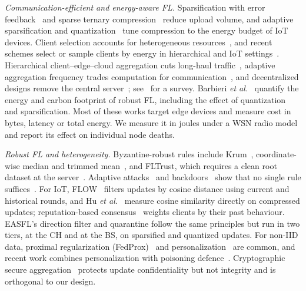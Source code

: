 \documentclass[journal]{IEEEtran}
\begin{document}
\textit{Communication-efficient and energy-aware FL.} Sparsification with error feedback~\cite{lin2018dgc,stich2018} and sparse ternary compression~\cite{sattler2020} reduce upload volume, and adaptive sparsification and quantization~\cite{marnissi2024,compaore2025,zhu2025} tune compression to the energy budget of IoT devices. Client selection accounts for heterogeneous resources~\cite{nishio2019}, and recent schemes select or sample clients by energy in hierarchical and IoT settings~\cite{trindade2024,trindade2026,yang2025symbiotic}. Hierarchical client--edge--cloud aggregation cuts long-haul traffic~\cite{liu2020hfl}, adaptive aggregation frequency trades computation for communication~\cite{wang2019adaptive}, and decentralized designs remove the central server~\cite{taherijavan2025}; see~\cite{yan2024survey} for a survey. Barbieri \textit{et al.}~\cite{barbieri2025} quantify the energy and carbon footprint of robust FL, including the effect of quantization and sparsification. Most of these works target edge devices and measure cost in bytes, latency or total energy. We measure it in joules under a WSN radio model and report its effect on individual node deaths.

\textit{Robust FL and heterogeneity.} Byzantine-robust rules include Krum~\cite{blanchard2017}, coordinate-wise median and trimmed mean~\cite{yin2018}, and FLTrust, which requires a clean root dataset at the server~\cite{cao2021}. Adaptive attacks~\cite{fang2020} and backdoors~\cite{bagdasaryan2020} show that no single rule suffices~\cite{uddin2025}. For IoT, FLOW~\cite{liu2024flow} filters updates by cosine distance using current and historical rounds, and Hu \textit{et al.}~\cite{hu2024} measure cosine similarity directly on compressed updates; reputation-based consensus~\cite{rashid2025} weights clients by their past behaviour. EASFL's direction filter and quarantine follow the same principles but run in two tiers, at the CH and at the BS, on sparsified and quantized updates. For non-IID data, proximal regularization (FedProx)~\cite{li2020fedprox} and personalization~\cite{arivazhagan2019,tan2023} are common, and recent work combines personalization with poisoning defence~\cite{cao2024,thein2024,sun2025}. Cryptographic secure aggregation~\cite{bonawitz2017} protects update confidentiality but not integrity and is orthogonal to our design.
\end{document}
